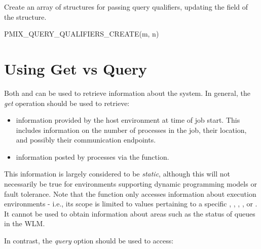 
Create an array of  structures for passing query qualifiers, updating the  field of the  structure.

\cspecificstart
\begin{codepar}
PMIX_QUERY_QUALIFIERS_CREATE(m, n)
\end{codepar}
\cspecificend

\begin{arglist}
\end{arglist}


\section{Using Get vs Query}
\label{chap:api_job_mgmt:query}

Both  and  can be used to retrieve information about the system. In general, the \emph{get} operation should be used to retrieve:

\begin{itemize}
\item information provided by the host environment at time of job start. This includes information on the number of processes in the job, their location, and possibly their communication endpoints.
\item information posted by processes via the  function.
\end{itemize}

This information is largely considered to be \emph{static}, although this will not necessarily be true for environments supporting dynamic programming models or fault tolerance. Note that the  function only accesses information about execution environments - i.e., its scope is limited to values pertaining to a specific , , , , or . It cannot be used to obtain information about areas such as the status of queues in the \ac{WLM}.

In contrast, the \emph{query} option should be used to access:


